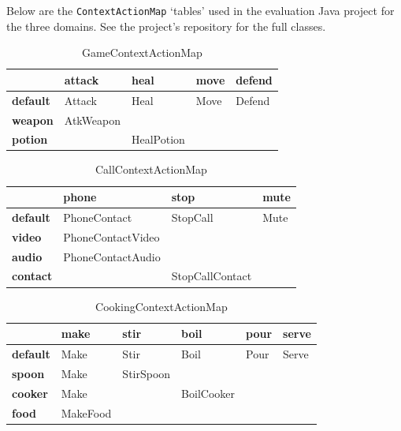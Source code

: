 \documentclass[11pt]{article}
\begin{document}
\begin{appendices}
Below are the \texttt{ContextActionMap} `tables' used in the evaluation Java project for the three domains. See the project's repository for the full classes.

\begin{table}[H]
\centering
\caption{GameContextActionMap}
\label{evaluation-game-table}
\begin{tabular}{l|l|l|l|l}
                 & \textbf{attack} & \textbf{heal} & \textbf{move} & \textbf{defend} \\ \hline
\textbf{default} & Attack          & Heal          & Move          & Defend          \\ \hline
\textbf{weapon}  & AtkWeapon       &               &               &                 \\ \hline
\textbf{potion}  &                 & HealPotion    &               &                 \\
\end{tabular}
\end{table}

\begin{table}[H]
\centering
\caption{CallContextActionMap}
\label{evaluation-call-table}
\begin{tabular}{l|l|l|l}
                 & \textbf{phone}    & \textbf{stop}   & \textbf{mute} \\ \hline
\textbf{default} & PhoneContact      & StopCall        & Mute          \\ \hline
\textbf{video}   & PhoneContactVideo &                 &               \\ \hline
\textbf{audio}   & PhoneContactAudio &                 &               \\ \hline
\textbf{contact} &                   & StopCallContact &               \\ 
\end{tabular}
\end{table}

\begin{table}[H]
\centering
\caption{CookingContextActionMap}
\label{evaluation-cooking-table}
\begin{tabular}{l|l|l|l|l|l}
                 & \textbf{make} & \textbf{stir} & \textbf{boil} & \textbf{pour} & \textbf{serve} \\ \hline
\textbf{default} & Make          & Stir          & Boil          & Pour          & Serve          \\ \hline
\textbf{spoon}   & Make          & StirSpoon     &               &               &                \\ \hline
\textbf{cooker}  & Make          &               & BoilCooker    &               &                \\ \hline
\textbf{food}    & MakeFood      &               &               &               &                \\
\end{tabular}
\end{table}


\end{appendices}
\end{document}
